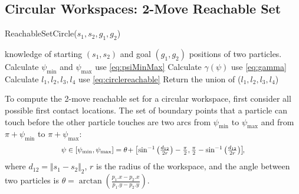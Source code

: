  
\subsection{Circular Workspaces: 2-Move Reachable Set}
\begin{algorithm}[htb]
\caption{ { \sc ReachableSetCircle}($s_1,s_2,g_1,g_2$)}\label{alg:circularReachbale}
\begin{algorithmic}[1]
\Require knowledge of starting $(s_1,s_2)$ and goal $(g_1,g_2)$ positions of  two particles. 
\State Calculate $\psi_{\min}$ and $\psi_{\max}$ \Comment use \eqref{eq:psiMinMax}
\State Calculate $\gamma(\psi)$ \Comment use \eqref{eq:gamma}
\State Calculate $l_1, l_2, l_3, l_4$ \Comment use \eqref{eq:circlereachable} 
\State Return the union of ($l_1, l_2, l_3, l_4$)
\end{algorithmic}
\end{algorithm}



To compute the 2-move reachable set for a circular workspace, first consider all possible first contact locations.
 The set of boundary points that a particle can touch before the  other particle  touches are two arcs from $\psi_{\min}$ to $\psi_{\max}$  and from $\pi+ \psi_{\min}$ to $\pi+ \psi_{\max}$:
 \begin{align}\label{eq:psiMinMax}
\scalebox{.9}{$   \psi \in [\psi_{\min}, \psi_{\max}]= \theta \!+  \left[ \sin^{-1} \left(\frac{d_{12}}{2r}  \right)- \frac{\pi}{2},  \frac{\pi}{2} -\sin^{-1} \left(\frac{d_{12}}{2r} \right) \right]\!\!,$}
\end{align}
where $d_{12}= \Vert s_1 - s_2\Vert_{\scriptscriptstyle 2}$, $r$ is the radius of the workspace,
and the angle between two particles is $\theta = \arctan(\frac{p_1.x-p_2.x}{p_1.y - p_2.y})$. 
 
